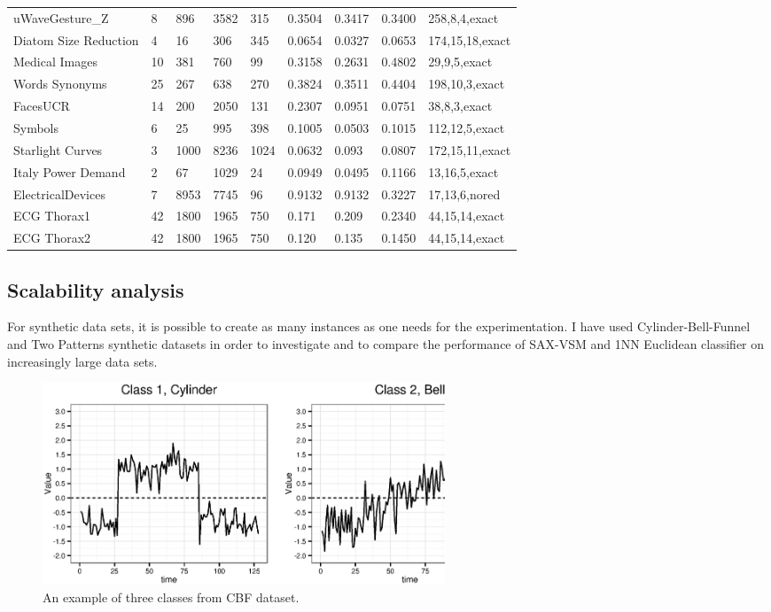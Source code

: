\begin{table}[t!]
{{\begin{tabularx}{\linewidth}{@{} l *7X @{} l}
uWaveGesture\_Z & 8 & 896 & 3582 & 315 & 0.3504 & 0.3417 & 0.3400 & 258,8,4,exact \\
Diatom Size Reduction & 4 & 16 & 306 & 345 & 0.0654 & 0.0327 & 0.0653 & 174,15,18,exact \\
Medical Images & 10 & 381 & 760 & 99 & 0.3158 & 0.2631 & 0.4802 & 29,9,5,exact \\
Words Synonyms & 25 & 267 & 638 & 270 & 0.3824 & 0.3511 & 0.4404 & 198,10,3,exact \\
FacesUCR & 14 & 200 & 2050 & 131 & 0.2307 & 0.0951 & 0.0751 & 38,8,3,exact \\
Symbols & 6 & 25 & 995 & 398 & 0.1005 & 0.0503 & 0.1015 & 112,12,5,exact \\
Starlight Curves & 3 & 1000 & 8236 & 1024 & 0.0632 & 0.093 & 0.0807 & 172,15,11,exact \\
Italy Power Demand & 2 & 67 & 1029 & 24 & 0.0949 & 0.0495 & 0.1166 & 13,16,5,exact \\
ElectricalDevices & 7 & 8953 & 7745 & 96 & 0.9132 & 0.9132 & 0.3227 & 17,13,6,nored \\
ECG Thorax1 & 42 & 1800 & 1965 & 750 & 0.171 & 0.209 & 0.2340 & 44,15,14,exact \\
ECG Thorax2 & 42 & 1800 & 1965 & 750 & 0.120 & 0.135 & 0.1450 & 44,15,14,exact \\
\hline
\end{tabularx}
}}
\end{table}

\newpage

\subsection{Scalability analysis} \label{scalability}
For synthetic data sets, it is possible to create as many instances as one needs for the experimentation.
I have used Cylinder-Bell-Funnel \cite{citeulike:12563781} and Two Patterns \cite{two_patterns} synthetic datasets 
in order to investigate and to compare the performance of SAX-VSM and 1NN Euclidean classifier on increasingly 
large data sets.

\begin{figure}[t]
   \centering
   \includegraphics[width=120mm]{figures/cbf.ps}
   \caption{An example of three classes from CBF dataset.}
   \label{fig:cbf}
\end{figure}

